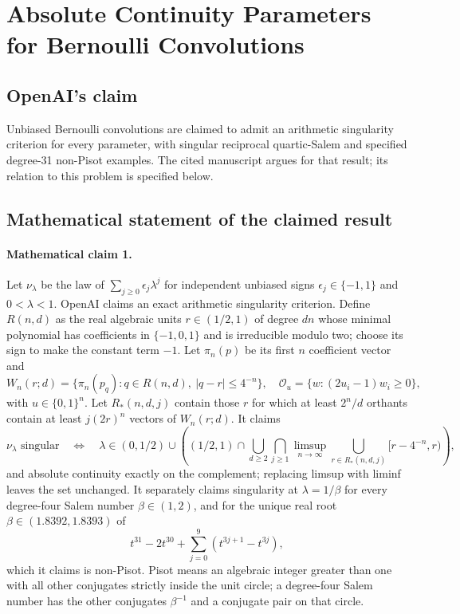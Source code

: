 \documentclass[11pt]{article}
\begin{document}
\section*{Absolute Continuity Parameters for Bernoulli Convolutions}

\subsection{OpenAI's claim}
Unbiased Bernoulli convolutions are claimed to admit an arithmetic singularity criterion for every parameter, with singular reciprocal quartic-Salem and specified degree-31 non-Pisot examples. The cited manuscript argues for that result; its relation to this problem is specified below.

\subsection{Mathematical statement of the claimed result}
\paragraph{Mathematical claim 1.} Let $\nu_\lambda$ be the law of $\sum_{j\ge0}\epsilon_j\lambda^j$ for independent unbiased signs $\epsilon_j\in\{-1,1\}$ and $0<\lambda<1$. OpenAI claims an exact arithmetic singularity criterion. Define $R(n,d)$ as the real algebraic units $r\in(1/2,1)$ of degree $dn$ whose minimal polynomial has coefficients in $\{-1,0,1\}$ and is irreducible modulo two; choose its sign to make the constant term $-1$. Let $\pi_n(p)$ be its first $n$ coefficient vector and
\[
W_n(r;d)=\{\pi_n(p_q):q\in R(n,d),\ |q-r|\le4^{-n}\},\quad
\mathcal O_u=\{w:(2u_i-1)w_i\ge0\},
\]
with $u\in\{0,1\}^n$. Let $R_*(n,d,j)$ contain those $r$ for which at least $2^n/d$ orthants contain at least $j(2r)^n$ vectors of $W_n(r;d)$. It claims
\[
\nu_\lambda\text{ singular}\quad\Longleftrightarrow\quad
\lambda\in(0,1/2)\cup\left((1/2,1)\cap\bigcup_{d\ge2}\bigcap_{j\ge1}\limsup_{n\to\infty}\bigcup_{r\in R_*(n,d,j)}[r-4^{-n},r)\right),
\]
and absolute continuity exactly on the complement; replacing limsup with liminf leaves the set unchanged.
It separately claims singularity at $\lambda=1/\beta$ for every degree-four Salem number $\beta\in(1,2)$, and for the unique real root $\beta\in(1.8392,1.8393)$ of
\[
t^{31}-2t^{30}+\sum_{j=0}^9(t^{3j+1}-t^{3j}),
\]
which it claims is non-Pisot. Pisot means an algebraic integer greater than one with all other conjugates strictly inside the unit circle; a degree-four Salem number has the other conjugates $\beta^{-1}$ and a conjugate pair on that circle.
\end{document}
